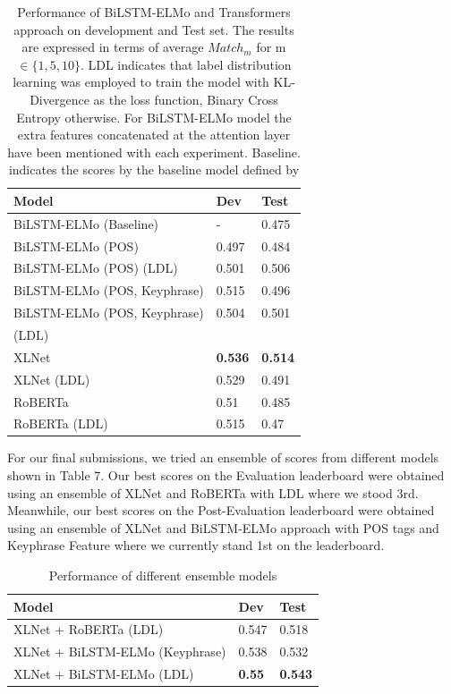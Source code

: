 \documentclass[letterpaper]{article} %
\begin{document}
\begin{table}[h!]
\centering
\begin{tabular}{ |l|l|l| }
 \hline
 \textbf{Model} & \textbf{Dev} & \textbf{Test} \\
 \hline
 BiLSTM-ELMo (Baseline)  & - & 0.475 \\
 \hline
 BiLSTM-ELMo (POS)  & 0.497 & 0.484 \\
 \hline
 BiLSTM-ELMo (POS) (LDL) & 0.501 & 0.506 \\
 \hline
 BiLSTM-ELMo (POS, Keyphrase) & 0.515 & 0.496 \\
 \hline
 BiLSTM-ELMo (POS, Keyphrase) & 0.504 & 0.501 \\
 (LDL) & & \\
 \hline
 XLNet & \textbf{0.536} & \textbf{0.514} \\
 \hline
 XLNet (LDL) & 0.529 & 0.491 \\
 \hline
 RoBERTa & 0.51 & 0.485\\
 \hline
 RoBERTa (LDL) & 0.515 & 0.47 \\
 \hline
\end{tabular}

\caption{Performance of BiLSTM-ELMo and Transformers approach on development and Test set. The results are expressed in terms of average $Match_m$ for m $\in \{1,5,10\}$. LDL indicates that label distribution learning was employed to train the model with KL-Divergence as the loss function, Binary Cross Entropy otherwise. For BiLSTM-ELMo model the extra features concatenated at the attention layer have been mentioned with each experiment. Baseline. indicates the scores by the baseline model defined by \citet{shirani2019learning}}
\label{table:5}
\end{table}
For our final submissions, we tried an ensemble of scores from different models shown in Table 7. Our best scores on the Evaluation leaderboard were obtained using an ensemble of XLNet and RoBERTa with LDL where we stood 3rd. Meanwhile, our best scores on the Post-Evaluation leaderboard were obtained using an ensemble of XLNet and BiLSTM-ELMo approach with POS tags and Keyphrase Feature where we currently stand 1st on the leaderboard.

\begin{table}[h!]
    \centering
    \begin{tabular}{|l|l|l|}
    \hline
     \textbf{Model} & \textbf{Dev} & \textbf{Test}  \\
     \hline
     XLNet + RoBERTa (LDL) & 0.547 & 0.518 \\
     \hline
     XLNet + BiLSTM-ELMo (Keyphrase)& 0.538 & 0.532 \\
     \hline
     XLNet + BiLSTM-ELMo (LDL) & \textbf{0.55} & \textbf{0.543} \\
     \hline
    \end{tabular}
    \caption{Performance of different ensemble models}
    \label{table:6}
\end{table}
\end{document}
